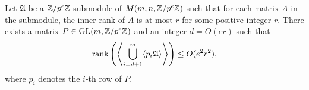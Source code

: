 \begin{lemma}\label{lem:char_main}
Let $\mathfrak{A}$ be a $\mathbb{Z} / p^e \mathbb{Z}$-submodule of $M(m, n, \mathbb{Z} / p^e \mathbb{Z})$ 
such that for each matrix $A$ in the submodule, the inner rank of $A$ is at most $r$ for some positive integer $r$. 
There exists a matrix $P \in \mathrm{GL}(m, \mathbb{Z} / p^e \mathbb{Z})$ and an integer $d = O(er)$ such that 
\[\rank\left(\left\langle \bigcup_{i = d+1}^{m} \langle p_i \mathfrak{A}\rangle \right\rangle\right) \leq O(e^2 r^2),\]
where $p_i$ denotes the $i$-th row of $P$.


\end{lemma}

